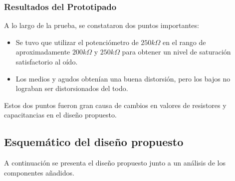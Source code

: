 \subsubsection{Resultados del Prototipado}
A lo largo de la prueba, se constataron dos puntos importantes:
\begin{itemize}
\item Se tuvo que utilizar el potenciómetro de $250k\Omega$ en el rango de aproximadamente $200k\Omega$ y $250k\Omega$ para obtener un nivel de saturación satisfactorio al oído.
\item Los medios y agudos obtenían una buena distorsión, pero los bajos no lograban ser distorsionados del todo.
\end{itemize}
Estos dos puntos fueron gran causa de cambios en valores de resistores y capacitancias en el diseño propuesto.

\subsection{Esquemático del diseño propuesto}

A continuación se presenta el diseño propuesto junto a un análisis de los componentes añadidos.

